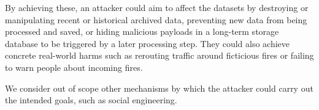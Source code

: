 By achieving these, an attacker could aim to affect the datasets by destroying or manipulating recent or historical archived data, preventing new data from being processed and saved, or hiding malicious payloads in a long-term storage database to be triggered by a later processing step.
They could also achieve concrete real-world harms such as rerouting traffic around ficticious fires or failing to warn people about incoming fires.




We consider out of scope other mechanisms by which the attacker could carry out the intended goals, such as social engineering.
